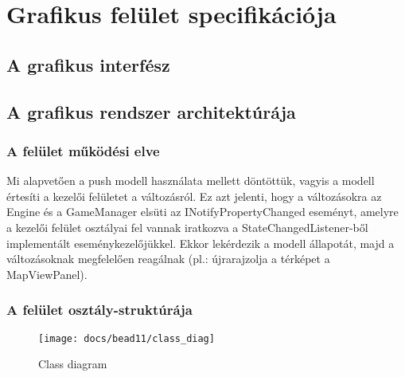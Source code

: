 \documentclass[../../projlab]{subfiles}
\begin{document}
\makeatletter


\makeatother

\chapter{Grafikus felület specifikációja}

\section{A grafikus interfész}

\section{A grafikus rendszer architektúrája}

\subsection{A felület működési elve}
        Mi alapvetően a push modell használata mellett döntöttük, vagyis a modell értesíti a kezelői felületet a változásról. Ez azt jelenti, hogy a változásokra az Engine és a GameManager elsüti az INotifyPropertyChanged eseményt, amelyre a kezelői felület osztályai fel vannak iratkozva a StateChangedListener-ből implementált eseménykezelőjükkel. Ekkor lekérdezik a modell állapotát, majd a változásoknak megfelelően reagálnak (pl.: újrarajzolja a térképet a MapViewPanel).
\subsection{A felület osztály-struktúrája}
\begin{figure}[H] 
    \centering 
    \texttt{[image: docs/bead11/class\_diag]} 
    \caption{Class diagram} 
\end{figure} 
\end{document}
